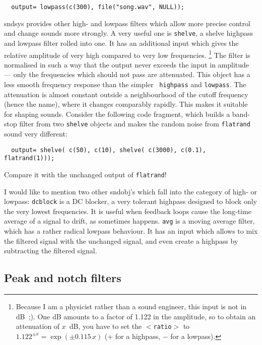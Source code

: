 \documentclass{article}
\def\s{{\sc sndsys} }
\def\bv{\begin{verbatim}}
\begin{document}
\bv
  output= lowpass(c(300), file("song.wav", NULL));
\end{verbatim}

\s provides other high- and lowpass filters which allow more precise control
and change sounds more strongly.  A very useful one is {\tt shelve}, a shelve
highpass and lowpass filter rolled into one.  It has an additional input which
gives the relative amplitude of very high compared to very low frequencies.%
%
\footnote{Because I am a physicist rather than a sound engineer, this input is
not in dB~;).  One dB amounts to a factor of 1.122 in the amplitude, so to
obtain an attenuation of $x$~dB, you have to set the {\tt $<$ratio$>$} to
$1.122^{\pm x}=\exp(\pm 0.115\,x)$ (+ for a highpass, $-$ for a lowpass).}
%
The filter is normalised in such a way that the output never exceeds the input
in amplitude --- only the frequencies which should not pass are attenuated.
This object has a less smooth frequency response than the simpler {\tt
highpass} and {\tt lowpass}.  The attenuation is almost constant outside a
neighbourhood of the cutoff frequency (hence the name), where it changes
comparably rapidly.  This makes it suitable for shaping sounds.  Consider the
following code fragment, which builds a band-stop filter from two {\tt shelve}
objects and makes the random noise from {\tt flatrand} sound very different:

\bv
  output= shelve( c(50), c(10), shelve( c(3000), c(0.1), flatrand(1)));
\end{verbatim}

Compare it with the unchanged output of {\tt flatrand}!

I would like to mention two other sndobj's which fall into the category of
high- or lowpass:  {\tt dcblock} is a DC blocker, a very tolerant highpass
designed to block only the very lowest frequencies.  It is useful when feedback
loops cause the long-time average of a signal to drift, as sometimes happens.
{\tt avg} is a moving average filter, which has a rather radical lowpass
behaviour.  It has an input which allows to mix the filtered signal with the
unchanged signal, and even create a highpass by subtracting the filtered
signal.


\subsection{Peak and notch filters}
\end{document}
